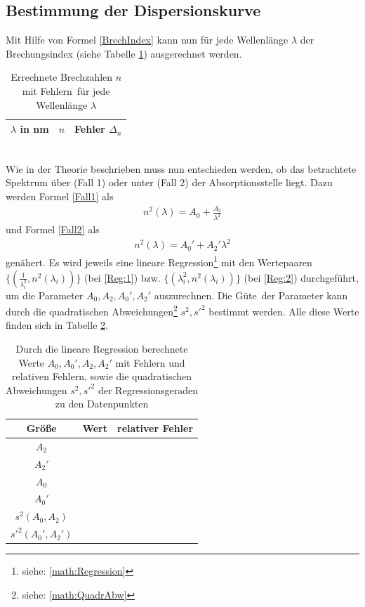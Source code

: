 \subsection{Bestimmung der Dispersionskurve}
Mit Hilfe von Formel \eqref{BrechIndex} kann nun für jede Wellenlänge $\lambda$ der Brechungsindex (siehe Tabelle \ref{tab:Brechzahl}) ausgerechnet werden.
\begin{table}[h!]
	\centering	
	\begin{tabular}{c|c|c}
		$\lambda$ in \si{\nano\meter} & $n$ & Fehler $\Delta_n$ \\
		\hline
		
	\end{tabular}
	\caption[Errechnete Brechzahlen $n$ mit Fehlern für jede Wellenlänge $\lambda$]{Errechnete Brechzahlen $n$ mit Fehlern\footnotemark\ für jede Wellenlänge $\lambda$}
	\label{tab:Brechzahl}
\end{table}
 \\
Wie in der Theorie beschrieben muss nun entschieden werden, ob das betrachtete Spektrum über (Fall 1) oder unter (Fall 2) der Absorptionsstelle liegt. Dazu werden Formel \eqref{Fall1} als
\begin{align}\label{Reg:1}
	n^2(\lambda) = A_0 + \frac{A_2}{\lambda^2}
\end{align}
und Formel \eqref{Fall2} als
\begin{align}\label{Reg:2}
	n^2(\lambda) = A_0' + A_2'\lambda^2
\end{align}
genähert. Es wird jeweils eine lineare Regression\footnote{siehe: \ref{math:Regression}} mit den Wertepaaren $\{ (\frac{1}{\lambda_i^2}, n^2(\lambda_i)) \}$ (bei \eqref{Reg:1}) bzw. $\{ (\lambda_i^2, n^2(\lambda_i)) \}$ (bei \eqref{Reg:2}) durchgeführt, um die Parameter $A_0, A_2, A_0', A_2'$ auszurechnen. Die \glqq Güte\grqq\ der Parameter kann durch die quadratischen Abweichungen\footnote{siehe: \ref{math:QuadrAbw}} $s^2, s'^2$ bestimmt werden. Alle diese Werte finden sich in Tabelle \ref{tab:Regression}.
\begin{table}[h!]
	\centering
	\begin{tabular}{c|c|c}
		Größe & Wert & relativer Fehler \\
		\hline
		$A_2$ &  &  \\
		$A_2'$ &  &  \\
		$A_0$ &  &  \\
		$A_0'$ &  &  \\
		\hline
		$s^2(A_0,A_2)$ &  & \\
		$s'^2(A_0',A_2')$ &  &
	\end{tabular}
	\caption{Durch die lineare Regression berechnete Werte $A_0,A_0',A_2,A_2'$ mit Fehlern und relativen Fehlern, sowie die quadratischen Abweichungen $s^2,s'^2$ der Regressionsgeraden zu den Datenpunkten}
	\label{tab:Regression}
\end{table}
